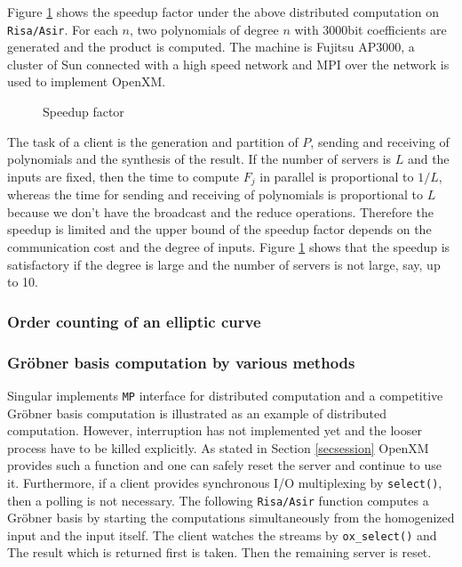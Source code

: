 Figure \ref{speedup}
shows the speedup factor under the above distributed computation
on {\tt Risa/Asir}. For each $n$, two polynomials of degree $n$
with 3000bit coefficients are generated and the product is computed.
The machine is Fujitsu AP3000,
a cluster of Sun connected with a high speed network and MPI over the
network is used to implement OpenXM.
\begin{figure}[htbp]
\epsfxsize=8.5cm
\caption{Speedup factor}
\label{speedup}
\end{figure}

The task of a client is the generation and partition of $P$, sending
and receiving of polynomials and the synthesis of the result. If the
number of servers is $L$ and the inputs are fixed, then the time to
compute $F_j$ in parallel is proportional to $1/L$, whereas the time
for sending and receiving of polynomials is proportional to $L$
because we don't have the broadcast and the reduce
operations. Therefore the speedup is limited and the upper bound of
the speedup factor depends on the communication cost and the degree
of inputs. Figure \ref{speedup} shows that 
the speedup is satisfactory if the degree is large and the number of
servers is not large, say, up to 10.

\subsubsection{Order counting of an elliptic curve}

\subsubsection{Gr\"obner basis computation by various methods}

Singular \cite{Singular} implements {\tt MP} interface for distributed
computation and a competitive Gr\"obner basis computation is
illustrated as an example of distributed computation.  However,
interruption has not implemented yet and the looser process have to be
killed explicitly. As stated in Section \ref{secsession} OpenXM
provides such a function and one can safely reset the server and
continue to use it.  Furthermore, if a client provides synchronous I/O
multiplexing by {\tt select()}, then a polling is not necessary.  The
following {\tt Risa/Asir} function computes a Gr\"obner basis by
starting the computations simultaneously from the homogenized input and
the input itself.  The client watches the streams by {\tt ox\_select()}
and The result which is returned first is taken. Then the remaining
server is reset.

